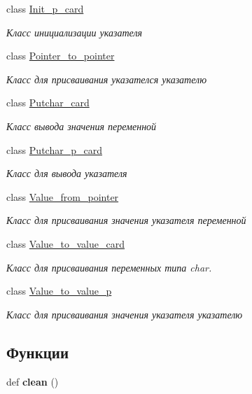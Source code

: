 \begin{DoxyCompactItemize}
class \mbox{\hyperlink{classcards_1_1_init__p__card}{Init\+\_\+p\+\_\+card}}
\begin{DoxyCompactList}\small\item\em Класс инициализации указателя \end{DoxyCompactList}\item 
class \mbox{\hyperlink{classcards_1_1_pointer__to__pointer}{Pointer\+\_\+to\+\_\+pointer}}
\begin{DoxyCompactList}\small\item\em Класс для присваивания указателся указателю \end{DoxyCompactList}\item 
class \mbox{\hyperlink{classcards_1_1_putchar__card}{Putchar\+\_\+card}}
\begin{DoxyCompactList}\small\item\em Класс вывода значения переменной \end{DoxyCompactList}\item 
class \mbox{\hyperlink{classcards_1_1_putchar__p__card}{Putchar\+\_\+p\+\_\+card}}
\begin{DoxyCompactList}\small\item\em Класс для вывода указателя \end{DoxyCompactList}\item 
class \mbox{\hyperlink{classcards_1_1_value__from__pointer}{Value\+\_\+from\+\_\+pointer}}
\begin{DoxyCompactList}\small\item\em Класс для присваивания значения указателя переменной \end{DoxyCompactList}\item 
class \mbox{\hyperlink{classcards_1_1_value__to__value__card}{Value\+\_\+to\+\_\+value\+\_\+card}}
\begin{DoxyCompactList}\small\item\em Класс для присваивания переменных типа char. \end{DoxyCompactList}\item 
class \mbox{\hyperlink{classcards_1_1_value__to__value__p}{Value\+\_\+to\+\_\+value\+\_\+p}}
\begin{DoxyCompactList}\small\item\em Класс для присваивания значения указателя указателю \end{DoxyCompactList}\end{DoxyCompactItemize}
\subsection*{Функции}
\begin{DoxyCompactItemize}
\item 
\mbox{\label{namespacecards_a001d40f16821796e2019c65c9e6277c2}} 
def {\bfseries clean} ()
\end{DoxyCompactItemize}

